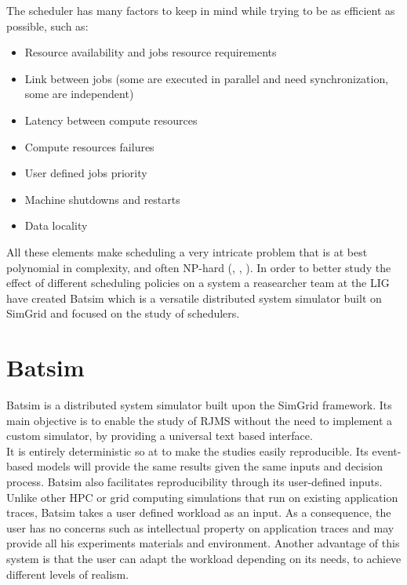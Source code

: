 The scheduler has many factors to keep in mind while trying to be as efficient
as possible, such as:

\begin{itemize}
	\item Resource availability and jobs resource requirements
	\item Link between jobs (some are executed in parallel and need synchronization, some are independent)
	\item Latency between compute resources
	\item Compute resources failures
	\item User defined jobs priority
	\item Machine shutdowns and restarts
	\item Data locality
\end{itemize}

All these elements make scheduling a very intricate problem that is at best
polynomial in complexity, and often NP-hard
(\cite{10.1016/S0022-0000(75)80008-0}, \cite{scheduler-complexity}, \cite{BLAZEWICZ198311}). In order
to better study the effect of different scheduling policies on a system a
reasearcher team at the LIG have created Batsim which is a versatile
distributed system simulator built on SimGrid and focused on the study of
schedulers.

\section{Batsim}

Batsim\cite{dutot:hal-01333471} is a distributed system simulator built upon
the SimGrid framework. Its main objective is to enable the study of RJMS
without the need to implement a custom simulator, by providing a universal text
based interface. \\

It is entirely deterministic so at to make the studies easily reproducible.
Its event-based models will provide the same results given the same inputs and
decision process. Batsim also facilitates reproducibility through its
user-defined inputs. Unlike other HPC or grid computing simulations that run on
existing application traces, Batsim takes a user defined workload as an input.
As a consequence, the user has no concerns such as intellectual property on
application traces and may provide all his experiments materials and
environment.  Another advantage of this system is that the user can adapt the
workload depending on its needs, to achieve different levels of realism.

